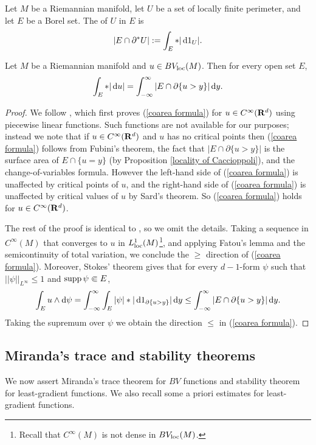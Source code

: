 \begin{definition}
Let $M$ be a Riemannian manifold, let $U$ be a set of locally finite perimeter, and let $E$ be a Borel set.
The  of $U$ in $E$ is
$$|E \cap \partial^* U| := \int_E *|\mathop{}\!\mathrm{d} 1_U|.$$
\end{definition}

\begin{proposition}\label{Coarea2}
Let $M$ be a Riemannian manifold and $u \in BV_{\mathrm{loc}}(M)$. Then for every open set $E$,
\begin{equation}\label{coarea formula}
\int_E *|\mathop{}\!\mathrm{d} u| = \int_{-\infty}^\infty |E \cap \partial \{u > y\}| \mathop{}\!\mathrm{d} y.
\end{equation}
\end{proposition}
\begin{proof}
We follow \cite[Theorem 1.23]{Giusti77}, which first proves (\ref{coarea formula}) for $u \in C^\infty(\mathbf{R}^d)$ using piecewise linear functions.
Such functions are not available for our purposes; instead we note that if $u \in C^\infty(\mathbf{R}^d)$ and $u$ has no critical points then (\ref{coarea formula}) follows from Fubini's theorem, the fact that $|E \cap \partial \{u > y\}|$ is the surface area of $E \cap \{u = y\}$ (by Proposition \ref{locality of Caccioppoli}), and the change-of-variables formula.
However the left-hand side of (\ref{coarea formula}) is unaffected by critical points of $u$, and the right-hand side of (\ref{coarea formula}) is unaffected by critical values of $u$ by Sard's theorem.
So (\ref{coarea formula}) holds for $u \in C^\infty(\mathbf{R}^d)$.

The rest of the proof is identical to \cite[Theorem 1.23]{Giusti77}, so we omit the details.
Taking a sequence in $C^\infty(M)$ that converges to $u$ in $L^1_{\mathrm{loc}}(M)$\footnote{Recall that $C^\infty(M)$ is not dense in $BV_{\mathrm{loc}}(M)$.}, and applying Fatou's lemma and the semicontinuity of total variation, we conclude the $\geq$ direction of (\ref{coarea formula}).
Moreover, Stokes' theorem gives that for every $d-1$-form $\psi$ such that $||\psi||_{L^\infty} \leq 1$ and $\operatorname{supp} \psi \Subset E$,
$$\int_E u \wedge \mathop{}\!\mathrm{d} \psi = \int_{-\infty}^\infty \int_E |\psi| * |\mathop{}\!\mathrm{d} 1_{\partial \{u > y\}}| \mathop{}\!\mathrm{d} y \leq \int_{-\infty}^\infty |E \cap \partial \{u > y\}| \mathop{}\!\mathrm{d} y.$$
Taking the supremum over $\psi$ we obtain the direction $\leq$ in (\ref{coarea formula}).
\end{proof}

\subsection{Miranda's trace and stability theorems}
We now assert Miranda's trace theorem for $BV$ functions and stability theorem for least-gradient functions.
We also recall some a priori estimates for least-gradient functions.

